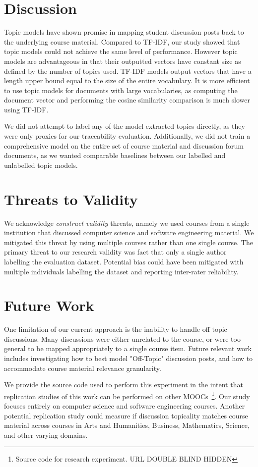 \documentclass[sigconf, anonymous]{acmart}
\begin{document}
\section{Discussion}
Topic models have shown promise in mapping student discussion posts back to the underlying course material.
Compared to TF-IDF, our study showed that topic models could not achieve the same level of performance.
However topic models are advantageous in that their outputted vectors have constant size as defined by the number of topics used.
TF-IDF models output vectors that have a length upper bound equal to the size of the entire vocabulary.
It is more efficient to use topic models for documents with large vocabularies, as computing the document vector and performing the cosine similarity comparison is much slower using TF-IDF.

We did not attempt to label any of the model extracted topics directly, as they were only proxies for our traceability evaluation.
Additionally, we did not train a comprehensive model on the entire set of course material and discussion forum documents, as we wanted comparable baselines between our labelled and unlabelled topic models.

\section{Threats to Validity}
We acknowledge \textit{construct validity} threats, namely we used courses from a single institution that discussed computer science and software engineering material. We mitigated this threat by using multiple courses rather than one single course.
The primary threat to our research validity was fact that only a single author labelling the evaluation dataset.
Potential bias could have been mitigated with multiple individuals labelling the dataset and reporting inter-rater reliability.

\section{Future Work}
One limitation of our current approach is the inability to handle off topic discussions.
Many discussions were either unrelated to the course, or were too general to be mapped appropriately to a single course item.
Future relevant work includes investigating how to best model "Off-Topic" discussion posts, and how to accommodate course material relevance granularity.

We provide the source code used to perform this experiment in the intent that replication studies of this work can be performed on other MOOCs~\footnote{Source code for research experiment.
    URL DOUBLE BLIND HIDDEN}.
Our study focuses entirely on computer science and software engineering courses.
Another potential replication study could measure if discussion topicality matches course material across courses in Arts and Humanities, Business, Mathematics, Science, and other varying domains.
\end{document}
